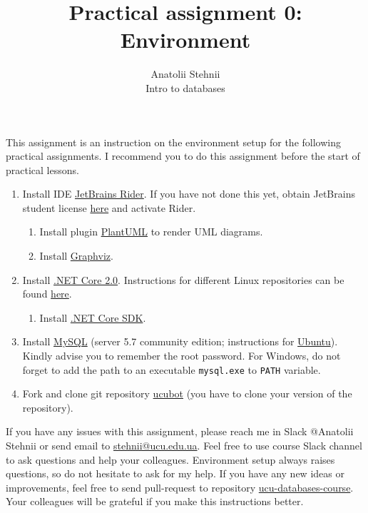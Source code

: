 \documentclass[12pt]{article}
\newcommand{\code}[1]{\texttt{#1}}
\begin{document}
\title{Practical assignment 0: Environment}
\author{Anatolii Stehnii\\Intro to databases}
\maketitle

This assignment is an instruction on the environment setup for the following practical assignments. I recommend you to do this assignment before the start of practical lessons.

\begin{enumerate}
\item Install IDE \href{https://www.jetbrains.com/rider/download/}{JetBrains Rider}. If you have not done this yet, obtain JetBrains student license \href{https://www.jetbrains.com/student/}{here} and activate Rider.
\begin{enumerate}
\item Install plugin \href{https://plugins.jetbrains.com/plugin/7017-plantuml-integration}{PlantUML} to render UML diagrams.
\item Install \href{http://www.graphviz.org/download/}{Graphviz}.
\end{enumerate}
\item Install \href{https://www.microsoft.com/net/learn/get-started}{.NET Core 2.0}. Instructions for different Linux repositories can be found  \href{https://docs.microsoft.com/ru-ru/dotnet/core/linux-prerequisites?tabs=netcore2x}{here}.
\begin{enumerate}
\item Install \href{https://github.com/dotnet/core/blob/master/release-notes/download-archives/1.0.4-sdk-download.md}{.NET Core SDK}.
\end{enumerate}
\item Install \href{https://www.mysql.com/}{MySQL} (server 5.7 community edition; instructions for \href{https://www.digitalocean.com/community/tutorials/how-to-install-mysql-on-ubuntu-16-04}{Ubuntu}). Kindly advise you to remember the root password. For Windows, do not forget to add the path to an executable \code{mysql.exe} to \code{PATH} variable.
\item Fork and clone git repository \href{https://github.com/tsdaemon/ucubot}{ucubot} (you have to clone your version of the repository).

\end{enumerate}

If you have any issues with this assignment, please reach me in Slack @Anatolii Stehnii or send email to \href{mailto:stehnii@ucu.edu.ua}{stehnii@ucu.edu.ua}. Feel free to use course Slack channel to ask questions and help your colleagues. Environment setup always raises questions, so do not hesitate to ask for my help. If you have any new ideas or improvements, feel free to send pull-request to repository \href{https://github.com/tsdaemon/ucu-databases-course}{ucu-databases-course}. Your colleagues will be grateful if you make this instructions better.
\end{document}

